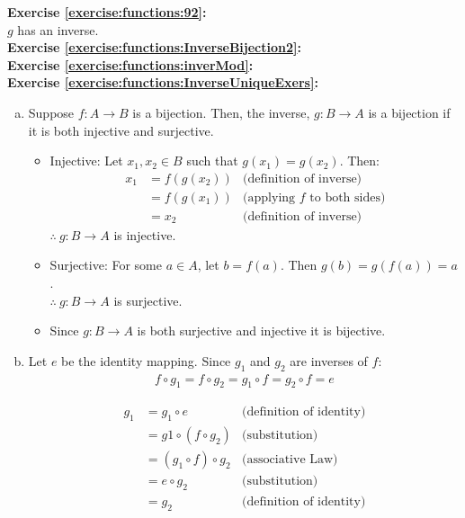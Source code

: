 \noindent\textbf{Exercise \ref{exercise:functions:92}:}\\
$g$ has an inverse.\\

\noindent\textbf{Exercise \ref{exercise:functions:InverseBijection2}:}\\

\noindent\textbf{Exercise \ref{exercise:functions:inverMod}:}\\

\noindent\textbf{Exercise \ref{exercise:functions:InverseUniqueExers}:} %
\begin{enumerate}[(a)]
\item \label{InverseUniqueExers-bij}
Suppose $f\colon A\to B$ is a bijection. Then, the inverse, $g\colon B\to A$ is a bijection if it is both injective and surjective.\\
	\begin{itemize}
	\item 
	Injective: Let $x_{1},x_{2}\in B$ such that $g(x_{1}) = g(x_{2})$. Then:
	\begin{align*}
	x_{1} &= f(g(x_{2})) &\text{(definition of inverse)}\\
	&= f(g(x_{1})) &\text{(applying $f$ to both sides)}\\
	&= x_{2} &\text{(definition of inverse)}
	\end{align*}
	$\therefore\ g:B\to A$ is injective.

	\item 
	Surjective: For some $a\in A$, let $b = f(a)$. Then $g(b) = g(f(a)) = a$.\\
	$\therefore\ g\colon B\to A$ is surjective.
            
	\item
	Since $g\colon B\to A$ is both surjective and injective it is bijective.
	\end{itemize}
	
\item \label{InverseUniqueExers-unique}
Let $e$ be the identity mapping. Since $g_{1}$ and $g_{2}$ are inverses of $f$:
\begin{align*}
f\circ g_{1} = f\circ g_{2} = g_{1}\circ f = g_{2}\circ f = e
\end{align*}
        
\begin{align*}
g_{1} &= g_{1}\circ e &\text{(definition of identity)}\\
&= g{1}\circ (f\circ g_{2}) &\text{(substitution)}\\
&= (g_{1}\circ f)\circ g_{2} &\text{(associative Law)}\\
&= e\circ g_{2} &\text{(substitution)}\\
&= g_{2} &\text{(definition of identity)}
\end{align*}
\end{enumerate}

